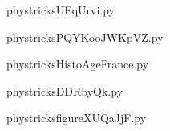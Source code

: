     

    \clearpage
    


    \newcommand{\CaptionFigUEqUrvi}{<+Type your caption here+>}
    \begin{center}
        
    \end{center}
    phystricksUEqUrvi.py

    

    \clearpage
    


    \newcommand{\CaptionFigPQYKooJWKpVZ}{<+Type your caption here+>}
    \begin{center}
        
    \end{center}
    phystricksPQYKooJWKpVZ.py

    

    \clearpage
    


    \newcommand{\CaptionFigHistoAgeFrance}{<+Type your caption here+>}
    \begin{center}
        
    \end{center}
    phystricksHistoAgeFrance.py

    

    \clearpage
    


    \newcommand{\CaptionFigDDRbyQk}{<+Type your caption here+>}
    \begin{center}
        
    \end{center}
    phystricksDDRbyQk.py

    

    \clearpage
    


    \newcommand{\CaptionFigfigureXUQaJjF}{<+Type your caption here+>}
    \begin{center}
        
    \end{center}
    phystricksfigureXUQaJjF.py

    

    \clearpage
    


